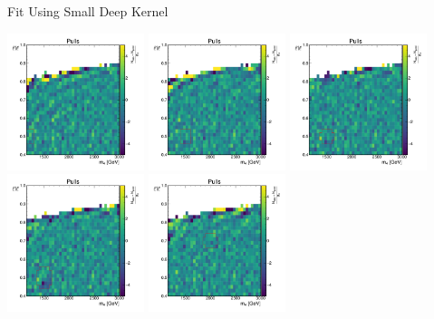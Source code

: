 \documentclass[10pt]{beamer}
\begin{document}
\begin{frame}{Fit Using Small Deep Kernel}
  \begin{center}
    \includegraphics[width=0.3\textwidth]{figures/2dpullplots/nnrbf_16_8/E_1200_0p5_100_0p05.pdf} 
    \includegraphics[width=0.3\textwidth]{figures/2dpullplots/nnrbf_16_8/E_1500_0p5_100_0p05.pdf} 
    \includegraphics[width=0.3\textwidth]{figures/2dpullplots/nnrbf_16_8/E_1500_0p5_150_0p05.pdf} 
    \includegraphics[width=0.3\textwidth]{figures/2dpullplots/nnrbf_16_8/E_1500_0p5_150_0p07.pdf} 
    \includegraphics[width=0.3\textwidth]{figures/2dpullplots/nnrbf_16_8/E_2000_0p7_150_0p05.pdf} 

\end{center}
\end{frame}
\end{document}
